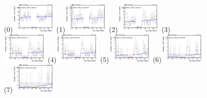 \begin{figure}[h!]
        \centering
        \subfigure(0){\includegraphics[width=0.2\textwidth]{unfixed_exp/plots/taumu/massfit_taumu_40bins_bdtcut0.0.png}}
        \subfigure(1){\includegraphics[width=0.2\textwidth]{unfixed_exp/plots/taumu/massfit_taumu_40bins_bdtcut0.06.png}}
        \subfigure(2){\includegraphics[width=0.2\textwidth]{unfixed_exp/plots/taumu/massfit_taumu_40bins_bdtcut0.12.png}}
        \subfigure(3){\includegraphics[width=0.2\textwidth]{unfixed_exp/plots/taumu/massfit_taumu_40bins_bdtcut0.18.png}}
        \subfigure(4){\includegraphics[width=0.2\textwidth]{unfixed_exp/plots/taumu/massfit_taumu_40bins_bdtcut0.2.png}}
        \subfigure(5){\includegraphics[width=0.2\textwidth]{unfixed_exp/plots/taumu/massfit_taumu_40bins_bdtcut0.24.png}}
        \subfigure(6){\includegraphics[width=0.2\textwidth]{unfixed_exp/plots/taumu/massfit_taumu_40bins_bdtcut0.28.png}}
        \subfigure(7){\includegraphics[width=0.2\textwidth]{unfixed_exp/plots/taumu/massfit_taumu_40bins_bdtcut0.32.png}}

\end{figure}
